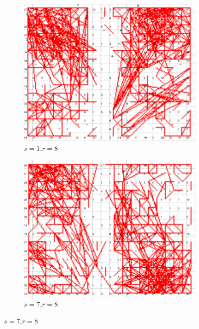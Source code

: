 \documentclass{acm_proc_article-sp}
\begin{document}
\begin{figure}
\centering
    \centering
    \begin{subfigure}[b]{0.30\linewidth}
        \includegraphics[width=\linewidth]{img/wine-newmid-radius-neighbourhood-graph--r-08-seed-1}
        \caption{$s=1$,$r=8$}
    \end{subfigure}
    \begin{subfigure}[b]{0.30\linewidth}
        \includegraphics[width=\linewidth]{img/wine-newmid-radius-neighbourhood-graph--r-08-seed-7}
        \caption{$s=7$,$r=8$}
    \end{subfigure}

\end{figure}
\end{document}
